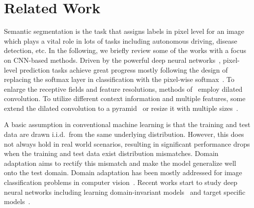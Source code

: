\documentclass[10pt,twocolumn,letterpaper]{article}
\begin{document}
\section{Related Work}
Semantic segmentation is the task that assigns labels in pixel level for an image which plays a vital role in lots of tasks including autonomous driving, disease detection, etc. In the following, we briefly review some of the works with a focus on CNN-based methods. Driven by the powerful deep neural networks~\cite{He_2016_resnet}, pixel-level prediction tasks achieve great progress mostly following the design of replacing the softmax layer in classification with the pixel-wise softmax~\cite{Long_2015_fcn}. To enlarge the receptive fields and feature resolutions, methods of~\cite{deeplab, chen2017rethinking,deeplabv3plus2018, zhao2017pspnet} employ dilated convolution. To utilize different context information and multiple features, some extend the dilated convolution to a pyramid~\cite{deeplab,chen2017rethinking,deeplabv3plus2018} or resize it with multiple sizes~\cite{zhao2017pspnet}.


\vspace{3pt}
A basic assumption in conventional machine learning is that the training and test data are drawn i.i.d.\ from the same underlying distribution. However, this does not always hold in real world scenarios, resulting in significant performance drops when the training and test data exist distribution mismatches. Domain adaptation aims to rectify this mismatch and make the model generalize well onto the test domain. Domain adaptation has been mostly addressed for image classification problems in computer vision~\cite{DuanTPAMI2012a,DuanTPAMI2012b,gong_gfk,gong_landmarks,dann,dan,jan}. Recent works start to study deep neural networks including learning domain-invariant models~\cite{dann,MCD_Saito_2018_CVPR,gan2016learning} and target specific models~\cite{dirt_t, french2018selfensembling}.
\end{document}
